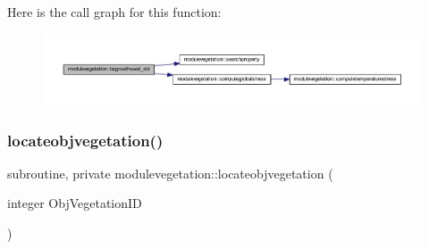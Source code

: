 Here is the call graph for this function\+:\nopagebreak
\begin{figure}[H]
\begin{center}
\leavevmode
\includegraphics[width=350pt]{namespacemodulevegetation_a0ec3ba9198a58232c38fd166c72810d5_cgraph}
\end{center}
\end{figure}
\mbox{\label{namespacemodulevegetation_ac457b656dd70c067c1609578542d0d16}} 
\subsubsection{\texorpdfstring{locateobjvegetation()}{locateobjvegetation()}}
{\footnotesize\ttfamily subroutine, private modulevegetation\+::locateobjvegetation (\begin{DoxyParamCaption}\item[{integer}]{Obj\+Vegetation\+ID }\end{DoxyParamCaption})\hspace{0.3cm}{\ttfamily [private]}}

